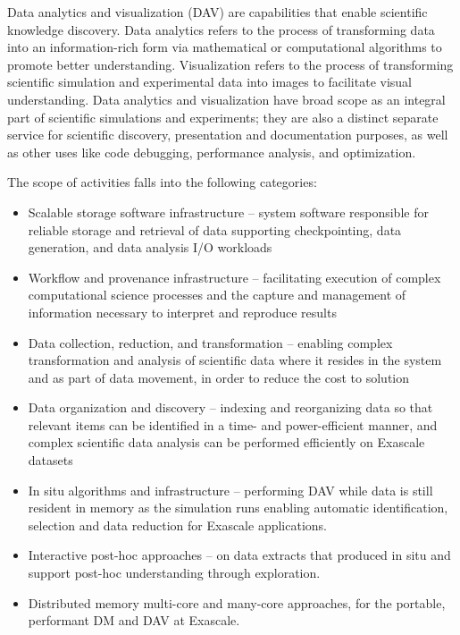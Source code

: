 Data analytics and visualization (DAV) are capabilities that enable scientific knowledge discovery. Data analytics refers to the process of transforming data into an information-rich form via mathematical or computational algorithms to promote better understanding. Visualization refers to the process of transforming scientific simulation and experimental data into images to facilitate visual understanding. Data analytics and visualization have broad scope as an integral part of scientific simulations and experiments; they are also a distinct separate service for scientific discovery, presentation and documentation purposes, as well as other uses like code debugging, performance analysis, and optimization. 

The scope of activities falls into the following categories:
\begin{itemize}
\item Scalable storage software infrastructure – system software responsible for reliable storage and retrieval of data supporting checkpointing, data generation, and data analysis I/O workloads
\item Workflow and provenance infrastructure – facilitating execution of complex computational science processes and the capture and management of information necessary to interpret and reproduce results
\item Data collection, reduction, and transformation – enabling complex transformation and analysis of scientific data where it resides in the system and as part of data movement, in order to reduce the cost to solution
\item Data organization and discovery – indexing and reorganizing data so that relevant items can be identified in a time- and power-efficient manner, and complex scientific data analysis can be performed efficiently on Exascale datasets
\item In situ algorithms and infrastructure – performing DAV while data is still resident in memory as the simulation runs enabling automatic identification, selection and data reduction for Exascale applications.
\item Interactive post-hoc approaches – on data extracts that produced in situ and support post-hoc understanding through exploration.
\item Distributed memory multi-core and many-core approaches, for the portable, performant DM and DAV at Exascale.
\end{itemize}
